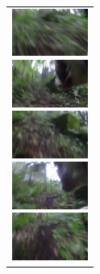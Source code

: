 \begin{figure}[htbp]
\begin{tabular}{l}
      \begin{minipage}{0.165\hsize}
        \begin{center}
          \includegraphics[clip, width=2.5cm]{./Figures/still_run1.eps}
        \end{center}
      \end{minipage}
      \begin{minipage}{0.165\hsize}
        \begin{center}
          \includegraphics[clip, width=2.5cm]{./Figures/still_run2.eps}
        \end{center}
      \end{minipage}
      \begin{minipage}{0.165\hsize}
        \begin{center}
          \includegraphics[clip, width=2.5cm]{./Figures/still_run3.eps}
        \end{center}
      \end{minipage}
      \begin{minipage}{0.165\hsize}
        \begin{center}
          \includegraphics[clip, width=2.5cm]{./Figures/still_run4.eps}
        \end{center}
      \end{minipage}
      \begin{minipage}{0.165\hsize}
        \begin{center}
          \includegraphics[clip, width=2.5cm]{./Figures/still_run5.eps}

\end{center}
\end{minipage}
\end{tabular}
\end{figure}

